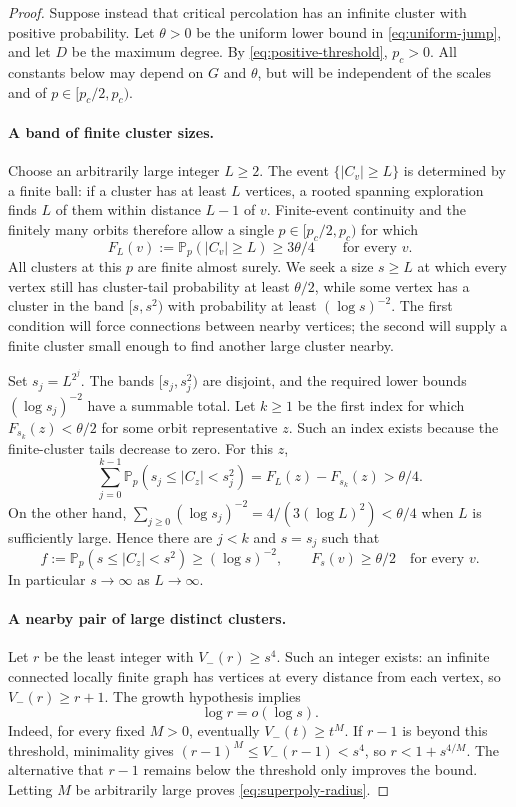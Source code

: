 \documentclass[11pt]{article}
\theoremstyle{definition}
\begin{document}
\begin{proof}
Suppose instead that critical percolation has an infinite cluster with
positive probability. Let $\theta>0$ be the uniform lower bound in
\eqref{eq:uniform-jump}, and let $D$ be the maximum degree.
By \eqref{eq:positive-threshold}, $p_c>0$.
All constants below may depend on $G$ and $\theta$, but will be
independent of the scales and of $p\in[p_c/2,p_c)$.

\paragraph{A band of finite cluster sizes.}
Choose an arbitrarily large integer $L\ge2$. The event
$\{|C_v|\ge L\}$ is determined by a finite ball: if a cluster has
at least $L$ vertices, a rooted spanning exploration finds $L$ of them
within distance $L-1$ of $v$. Finite-event continuity and the finitely
many orbits therefore allow a single $p\in[p_c/2,p_c)$ for which
\[
 F_L(v):=\mathbb P_p(|C_v|\ge L)\ge3\theta/4
 \qquad\text{for every }v.
\]
All clusters at this $p$ are finite almost surely. We seek a size
$s\ge L$ at which every vertex still has cluster-tail probability at
least $\theta/2$, while some vertex has a cluster in the band
$[s,s^2)$ with probability at least $(\log s)^{-2}$. The first condition
will force connections between nearby vertices; the second will supply
a finite cluster small enough to find another large cluster nearby.

Set $s_j=L^{2^j}$. The bands $[s_j,s_j^2)$ are disjoint, and the required
lower bounds $(\log s_j)^{-2}$ have a summable total. Let $k\ge1$ be
the first index for which
$F_{s_k}(z)<\theta/2$ for some orbit representative $z$.
Such an index exists because the finite-cluster tails decrease to zero.
For this $z$,
\[
 \sum_{j=0}^{k-1}\mathbb P_p(s_j\le |C_z|<s_j^2)
 =F_L(z)-F_{s_k}(z)>\theta/4.
\]
On the other hand,
$\sum_{j\ge0}(\log s_j)^{-2}=4/(3(\log L)^2)<\theta/4$
when $L$ is sufficiently large. Hence there are $j<k$ and $s=s_j$
such that
\begin{equation}\label{eq:superpoly-band}
 f:=\mathbb P_p(s\le |C_z|<s^2)\ge(\log s)^{-2},
 \qquad F_s(v)\ge\theta/2\quad\text{for every }v.
\end{equation}
In particular $s\to\infty$ as $L\to\infty$.

\paragraph{A nearby pair of large distinct clusters.}
Let $r$ be the least integer with $V_-(r)\ge s^4$.
Such an integer exists: an infinite connected locally finite graph has
vertices at every distance from each vertex, so $V_-(r)\ge r+1$.
The growth hypothesis implies
\begin{equation}\label{eq:superpoly-radius}
 \log r=o(\log s).
\end{equation}
Indeed, for every fixed $M>0$, eventually $V_-(t)\ge t^M$.
If $r-1$ is beyond this threshold, minimality gives
$(r-1)^M\le V_-(r-1)<s^4$, so $r<1+s^{4/M}$.
The alternative that $r-1$ remains below the threshold only improves
the bound. Letting $M$ be arbitrarily large proves
\eqref{eq:superpoly-radius}.


\end{proof}
\end{document}
